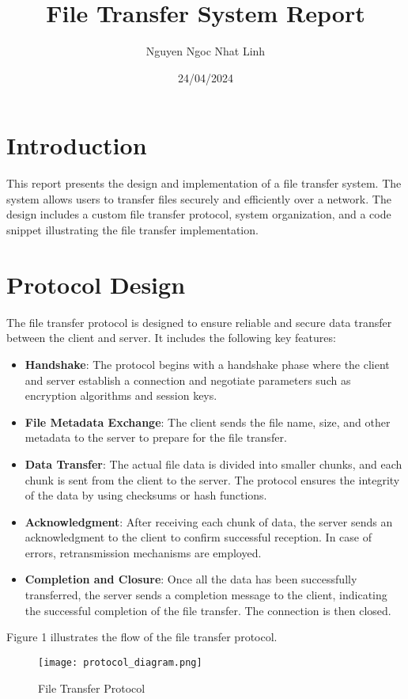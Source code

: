 \documentclass{article}
\title{File Transfer System Report}
\author{Nguyen Ngoc Nhat Linh}
\date{24/04/2024}
\begin{document}
\maketitle

\section{Introduction}
This report presents the design and implementation of a file transfer system. The system allows users to transfer files securely and efficiently over a network. The design includes a custom file transfer protocol, system organization, and a code snippet illustrating the file transfer implementation.

\section{Protocol Design}
The file transfer protocol is designed to ensure reliable and secure data transfer between the client and server. It includes the following key features:

\begin{itemize}
  \item \textbf{Handshake}: The protocol begins with a handshake phase where the client and server establish a connection and negotiate parameters such as encryption algorithms and session keys.
  \item \textbf{File Metadata Exchange}: The client sends the file name, size, and other metadata to the server to prepare for the file transfer.
  \item \textbf{Data Transfer}: The actual file data is divided into smaller chunks, and each chunk is sent from the client to the server. The protocol ensures the integrity of the data by using checksums or hash functions.
  \item \textbf{Acknowledgment}: After receiving each chunk of data, the server sends an acknowledgment to the client to confirm successful reception. In case of errors, retransmission mechanisms are employed.
  \item \textbf{Completion and Closure}: Once all the data has been successfully transferred, the server sends a completion message to the client, indicating the successful completion of the file transfer. The connection is then closed.
\end{itemize}

Figure 1 illustrates the flow of the file transfer protocol.

\begin{figure}[h]
  \centering
  \texttt{[image: protocol\_diagram.png]}
  \caption{File Transfer Protocol}
  \label{fig:protocol}
\end{figure}
\end{document}
